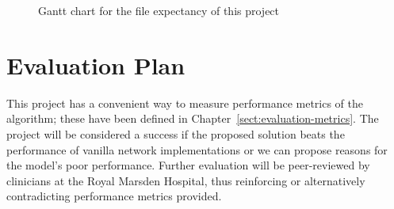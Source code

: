\documentclass[11pt,twoside]{report}
\begin{document}
\begin{figure}[H]\ContinuedFloat
  \centering


  \caption{Gantt chart for the file expectancy of this project}
  \label{fig:gantt}
\end{figure}

\section{Evaluation Plan}

This project has a convenient way to measure performance metrics of the algorithm; these have been defined in Chapter~\ref{sect:evaluation-metrics}. The project will be considered a success if the proposed solution beats the performance of vanilla network implementations or we can propose reasons for the model's poor performance. Further evaluation will be peer-reviewed by clinicians at the Royal Marsden Hospital, thus reinforcing or alternatively contradicting performance metrics provided.
\end{document}
